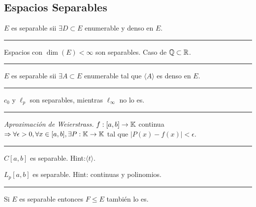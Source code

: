 \vfill 

\subsection*{Espacios Separables}

\begin{definition}
    \(E\) es separable sii \(\exists D\subset E\) enumerable y denso en \(E\). 
\end{definition}

\E

\hrule
\begin{example}
    Espacios con \(\dim (E)<\infty\) son separables. Caso de \(\mathbb{Q}\subset \mathbb{R}\). 
\end{example}
\hrule 

\E

\begin{proposition}
    \(E\) es separable sii \(\exists A\subset E\) enumerable tal que \(\langle A\rangle\) es denso en \(E\). 
\end{proposition}

\E

\hrule 
\begin{example}
    \(c_0\) y \(\ell_p \) son separables, mientras \(\ell_\infty\) no lo es. 
\end{example}
\hrule

\E

\begin{theorem}
    \emph{Aproximación de Weierstrass.} \(f:[a,b]\rightarrow \mathbb{K}\) continua \(\Rightarrow \forall\epsilon>0,\forall x\in [a,b], \exists P:\mathbb{K}\rightarrow \mathbb{K} \) tal que \(|P(x) - f(x)|<\epsilon \). 
\end{theorem}

\E

\hrule 
\begin{example}
    \(C[a,b]\) es separable. Hint:\(\langle t \rangle \). 
\end{example}
\begin{example}
    \(L_p[a,b]\) es separable. Hint: continuas y polinomios. 
\end{example}
\hrule 

\E

\begin{proposition}
    Si \(E\) es separable entonces \(F\leq E\) también lo es. 
\end{proposition}

